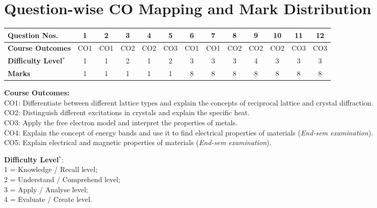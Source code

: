 \documentclass[11pt,a4paper]{article}
\begin{document}
\newpage
\section*{Question-wise CO Mapping and Mark Distribution}

\begin{center}
\footnotesize
\setlength{\tabcolsep}{4pt}
\renewcommand{\arraystretch}{1.5}
\begin{tabular}{|l|*{12}{c|}}
\hline
\textbf{Question Nos.} & 1 & 2 & 3 & 4 & 5 & 6 & 7 & 8 & 9 & 10 & 11 & 12 \\ \hline
\textbf{Course Outcomes} & CO1 & CO1 & CO2 & CO2 & CO3 & CO1 & CO1 & CO2 & CO2 & CO2 & CO3 & CO3 \\ \hline
\textbf{Difficulty Level}$^{*}$ & 1 & 1 & 2 & 1 & 2 & 3 & 3 & 3 & 4 & 3 & 3 & 3 \\ \hline
\textbf{Marks} & 1 & 1 & 1 & 1 & 1 & 8 & 8 & 8 & 8 & 8 & 8 & 8 \\ \hline
\end{tabular}
\end{center}

\vspace{0.3cm}

\noindent\footnotesize
\textbf{Course Outcomes:}\\
CO1: Differentiate between different lattice types and explain the concepts of reciprocal lattice and crystal diffraction.\\
CO2: Distinguish different excitations in crystals and explain the specific heat.\\
CO3: Apply the free electron model and interpret the properties of metals.\\
CO4: Explain the concept of energy bands and use it to find electrical properties of materials (\emph{End-sem examination}).\\
CO5: Explain electrical and magnetic properties of materials (\emph{End-sem examination}).

\smallskip
\noindent\footnotesize
\textbf{Difficulty Level}$^{*}$:\\
1 = Knowledge / Recall level;\\
2 = Understand / Comprehend level;\\
3 = Apply / Analyse level;\\
4 = Evaluate / Create level.
\end{document}
